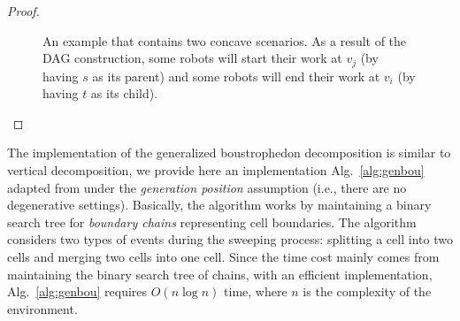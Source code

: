 \begin{proof}
\begin{figure} [ht]
    \caption{An example that contains two concave scenarios. As a result of the DAG construction, some robots will
    start their work at $v_j$ (by having $s$ as its parent) and some robots will end their work at $v_i$ (by having $t$ as its child).}
    \label{fig:concave_vertices}
\end{figure}
\end{proof}




The implementation of the generalized boustrophedon decomposition is similar 
to vertical decomposition, we provide here an implementation 
Alg.~\ref{alg:genbou} adapted from \cite{lavalle2006planning} under the 
\emph{generation position} assumption (i.e., there are no degenerative 
settings).
%
Basically, the algorithm works by maintaining a binary search tree for 
\emph{boundary chains} representing cell boundaries. The algorithm considers 
two types of events during the sweeping process: splitting a cell into two 
cells and merging two cells into one cell.
%
Since the time cost mainly comes from maintaining the binary search tree of 
chains, with an efficient implementation, Alg.~\ref{alg:genbou} requires 
$O(n \log n)$ time, where $n$ is the complexity of the environment. 


